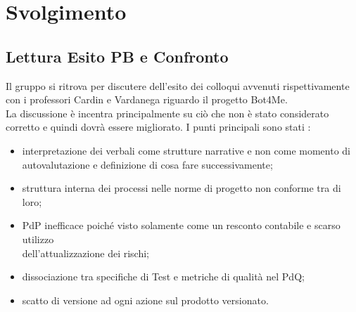 \section{Svolgimento}

\subsection{Lettura Esito PB e Confronto }
Il gruppo si ritrova per discutere dell'esito dei colloqui avvenuti rispettivamente con i professori Cardin e Vardanega riguardo il progetto Bot4Me. \\
La discussione è incentra principalmente su ciò che non è stato considerato corretto e quindi dovrà essere migliorato. I punti principali sono stati : 
\begin{itemize}
  \item interpretazione dei verbali come strutture narrative e non come momento di autovalutazione e definizione di cosa fare successivamente;
  \item struttura interna dei processi nelle norme di progetto non conforme tra di loro;
  \item PdP inefficace poiché visto solamente come un resconto contabile e scarso utilizzo \\ dell'attualizzazione dei rischi;
  \item dissociazione tra specifiche di Test e metriche di qualità nel PdQ; 
  \item scatto di versione ad ogni azione sul prodotto versionato.
\end{itemize}


